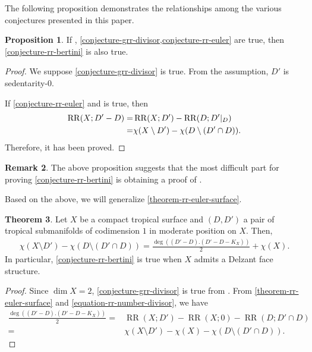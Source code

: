 \documentclass[a4paper,dvipdfmx,reqno,12pt]{amsart}
\theoremstyle{definition}
\newtheorem{theorem}{Theorem}[section]
\newtheorem{proposition}[theorem]{Proposition}
\newtheorem{remark}[theorem]{Remark}
\newcommand{\opn}[1]{\operatorname{#1}}
\numberwithin{equation}{section}
\begin{document}
The following proposition demonstrates
the relationships among the various conjectures
presented in this paper.

\begin{proposition}
If \label{proposition-euler-to-bertini}
\cite[Conjecture 6.13]{demedrano2023chern},
\cref{conjecture-grr-divisor,conjecture-rr-euler}
are true, then \cref{conjecture-rr-bertini} is also true. 
\end{proposition}

\begin{proof}
We suppose \cref{conjecture-grr-divisor} is true.
From the assumption, 
$D'$ is sedentarity-$0$. 


If \cref{conjecture-rr-euler} and 
\cite[Conjecture 6.13]{demedrano2023chern} is true,
then
\begin{align}
\opn{RR}(X;D'-D)=&\opn{RR}(X;D')-
\opn{RR}(D;D'|_{D}) \notag \\
=&\chi(X\setminus D')-\chi(D\setminus (D'\cap D)). \notag
\end{align}
Therefore, it has been proved.
\end{proof}

\begin{remark}
The above proposition suggests that the most difficult part
for proving \cref{conjecture-rr-bertini} is obtaining a proof of
\cite[Conjecture 6.13]{demedrano2023chern}.
\end{remark}

Based on the above, we will generalize
\cref{theorem-rr-euler-surface}.

\begin{theorem}
\label{theorem-rr-bertini-surface}
Let $X$ be a compact tropical surface
and $(D,D')$ a pair of tropical submanifolds of
codimension $1$ in moderate position on $X$.
Then,
\begin{align}
\chi(X\setminus D')-\chi(D\setminus (D'\cap D))
=\frac{\opn{deg}((D'-D).(D'-D-K_X))}{2}+\chi(X).
\end{align}
In particular, \cref{conjecture-rr-bertini} is true 
when $X$ admits a Delzant face structure.
\end{theorem}

\begin{proof}
Since $\dim X=2$, 
\cref{conjecture-grr-divisor} is true from
\cite[Theorem 5.2]{demedrano2023chern}.
From \cref{theorem-rr-euler-surface} and 
\eqref{equation-rr-number-divisor}, we have
\begin{align}
\frac{\opn{deg}((D'-D).(D'-D-K_X))}{2}=&
\opn{RR}(X;D')-\opn{RR}(X;0)-
\opn{RR}(D;D'\cap D) \\
=&\chi(X\setminus D')-\chi(X)-\chi(D\setminus (D'\cap D)).
\end{align}
\end{proof}
\end{document}
